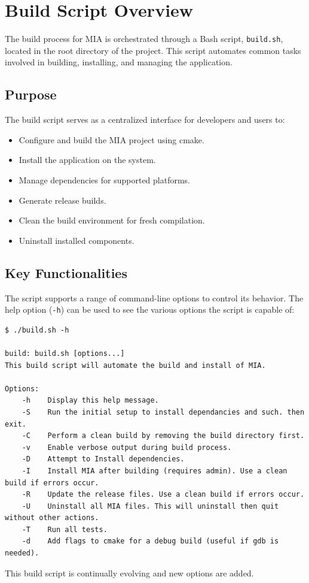 \section{Build Script Overview}
\label{section:build_script}

The build process for MIA is orchestrated through a Bash script, \texttt{build.sh}, located in the root directory of the project. This script automates common tasks involved in building, installing, and managing the application.

\subsection{Purpose}

The build script serves as a centralized interface for developers and users to:
\begin{itemize}\itemsep0em
	\item Configure and build the MIA project using cmake.
	\item Install the application on the system.
	\item Manage dependencies for supported platforms.
	\item Generate release builds.
	\item Clean the build environment for fresh compilation.
	\item Uninstall installed components.
\end{itemize}

\subsection{Key Functionalities}

The script supports a range of command-line options to control its behavior. The help option (\texttt{-h}) can be used to see the various options the script is capable of:
\begin{lstlisting}[style=terminalstyle]
$ ./build.sh -h

build: build.sh [options...]
This build script will automate the build and install of MIA.

Options:
    -h    Display this help message.
	-S    Run the initial setup to install dependancies and such. then exit.
	-C    Perform a clean build by removing the build directory first.
	-v    Enable verbose output during build process.
	-D    Attempt to Install dependencies.
	-I    Install MIA after building (requires admin). Use a clean build if errors occur.
	-R    Update the release files. Use a clean build if errors occur.
	-U    Uninstall all MIA files. This will uninstall then quit without other actions.
	-T    Run all tests.
	-d    Add flags to cmake for a debug build (useful if gdb is needed).
\end{lstlisting}
This build script is continually evolving and new options are added.


